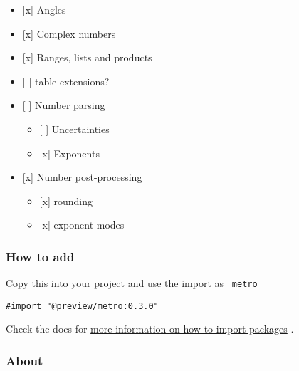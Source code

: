 \begin{itemize}
\tightlist
\item
  {[}x{]} Angles
\item
  {[}x{]} Complex numbers
\item
  {[}x{]} Ranges, lists and products
\item
  {[} {]} table extensions?
\item
  {[} {]} Number parsing

  \begin{itemize}
  \tightlist
  \item
    {[} {]} Uncertainties
  \item
    {[}x{]} Exponents
  \end{itemize}
\item
  {[}x{]} Number post-processing

  \begin{itemize}
  \tightlist
  \item
    {[}x{]} rounding
  \item
    {[}x{]} exponent modes
  \end{itemize}
\end{itemize}

\subsubsection{How to add}\label{how-to-add}

Copy this into your project and use the import as \texttt{\ metro\ }

\begin{verbatim}
#import "@preview/metro:0.3.0"
\end{verbatim}



Check the docs for
\href{https://typst.app/docs/reference/scripting/\#packages}{more
information on how to import packages} .

\subsubsection{About}\label{about}

